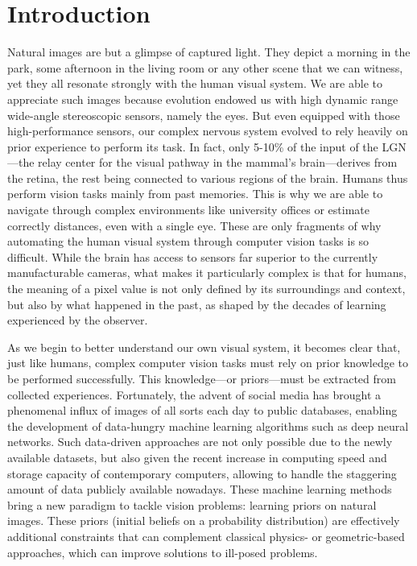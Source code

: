 \chapter*{Introduction}         %

Natural images are but a glimpse of captured light. They depict a morning in the park, some afternoon in the living room or any other scene that we can witness, yet they all resonate strongly with the human visual system. We are able to appreciate such images because evolution endowed us with high dynamic range wide-angle stereoscopic sensors, namely the eyes. But even equipped with those high-performance sensors, our complex nervous system evolved to rely heavily on prior experience to perform its task. In fact, only 5-10\% of the input of the LGN---the relay center for the visual pathway in the mammal's brain---derives from the retina, the rest being connected to various regions of the brain. Humans thus perform vision tasks mainly from past memories. This is why we are able to navigate through complex environments like university offices or estimate correctly distances, even with a single eye. These are only fragments of why automating the human visual system through computer vision tasks is so difficult. While the brain has access to sensors far superior to the currently manufacturable cameras, what makes it particularly complex is that for humans, the meaning of a pixel value is not only defined by its surroundings and context, but also by what happened in the past, as shaped by the decades of learning experienced by the observer. 

As we begin to better understand our own visual system, it becomes clear that, just like humans, complex computer vision tasks must rely on prior knowledge to be performed successfully. This knowledge---or priors---must be extracted from collected experiences. Fortunately, the advent of social media has brought a phenomenal influx of images of all sorts each day to public databases, enabling the development of data-hungry machine learning algorithms such as deep neural networks. Such data-driven approaches are not only possible due to the newly available datasets, but also given the recent increase in computing speed and storage capacity of contemporary computers, allowing to handle the staggering amount of data publicly available nowadays. These machine learning methods bring a new paradigm to tackle vision problems: learning priors on natural images. These priors (initial beliefs on a probability distribution) are effectively additional constraints that can complement classical physics- or geometric-based approaches, which can improve solutions to ill-posed problems. 

